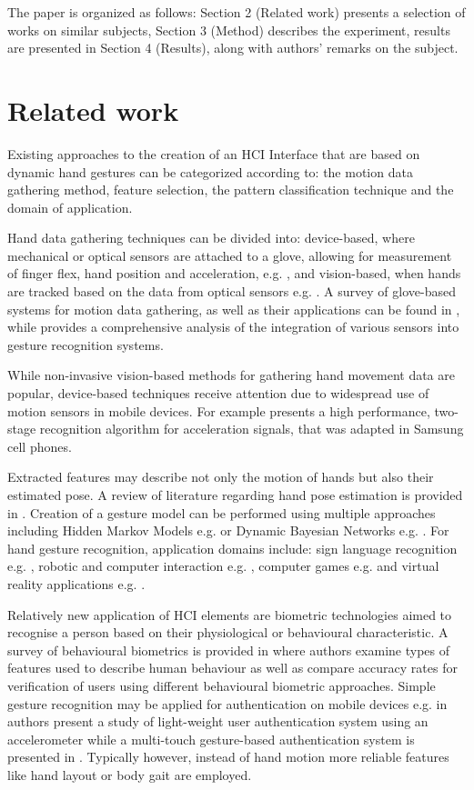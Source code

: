 \documentclass[]{article}
\begin{document}
The paper is organized as follows: Section 2 (Related work) presents a selection
of works on similar subjects, Section 3 (Method) describes the experiment,
results are presented in Section 4 (Results), along with authors' remarks on the
subject.

\section{Related work}
Existing approaches  to the creation of an HCI Interface that are based on
dynamic hand gestures can be categorized according to: the motion data gathering
method, feature selection, the pattern classification technique and the
domain of application.

Hand data gathering techniques can be divided into: device-based, where
mechanical or optical sensors are attached to a glove, allowing for measurement
of finger flex, hand position and acceleration, e.g.  \cite{Zhang:2009}, and
vision-based, when hands are tracked based on the data from optical sensors e.g.
\cite{Lahamy:2010}. A survey of glove-based systems for motion data
gathering, as well as their applications can be found in 
\cite{Dipietro:2008}, while \cite{Berman:2011} provides a comprehensive
analysis of the integration of various sensors into gesture recognition systems.

While non-invasive vision-based methods for gathering hand movement data are
popular, device-based techniques receive attention due to widespread use of
motion sensors in mobile devices. For example \cite{WandAccel:2006} presents
a high performance, two-stage recognition algorithm for acceleration signals,
that was adapted in Samsung cell phones.

Extracted features may describe not only the motion of hands but also their
estimated pose. A review of literature regarding hand pose estimation is
provided in \cite{Erol:2007}. Creation of a gesture model can be performed
using multiple approaches including Hidden Markov Models e.g. 
\cite{Mitra:2007} or Dynamic Bayesian Networks e.g. \cite{Xu:2006}. For
hand gesture recognition, application domains include: sign language recognition
e.g. \cite{Cooper_Visual:2011}, robotic and computer interaction e.g.
\cite{Lee:2006}, computer games e.g. \cite{Chan:2009} and virtual reality
applications e.g. \cite{Xu:2006}.

Relatively new application of HCI elements are biometric technologies aimed to
recognise a person based on their physiological or behavioural characteristic. A
survey of behavioural biometrics is provided in \cite{Yampolskiy:2008} where
authors examine types of features used to describe human behaviour as well as
compare accuracy rates for verification of users using different behavioural
biometric approaches. Simple gesture recognition may be applied for
authentication on mobile devices e.g. in \cite{Liu:2009} authors present a
study of light-weight user authentication system using an accelerometer while a
multi-touch gesture-based authentication system is presented in
\cite{Sae-Bae:2012}. Typically however, instead of hand motion more reliable
features like  hand layout \cite{Adan:2008} or body gait \cite{2003:Kale}
are employed. 
\end{document}
